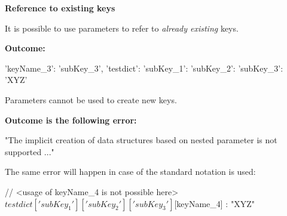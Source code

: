 \vspace{2ex}

\textbf{Reference to existing keys}

It is possible to use parameters to refer to \textit{already existing} keys.


\vspace{2ex}

\textbf{Outcome:}

\begin{pythonlog}
{'keyName_3': 'subKey_3',
 'testdict': {'subKey_1': {'subKey_2': {'subKey_3': 'XYZ'}}}}
\end{pythonlog}

\vspace{2ex}

Parameters cannot be used to create new keys.


\vspace{2ex}

\textbf{Outcome is the following error:}

\begin{pythonlog}
"The implicit creation of data structures based on nested parameter is not supported ..."
\end{pythonlog}

The same error will happen in case of the standard notation is used:

\begin{pythoncode}
{
   // <usage of keyName\_4 is not possible here>
   ${testdict}['subKey_1']['subKey_2']['subKey_3'][${keyName_4}] : "XYZ"
}
\end{pythoncode}










